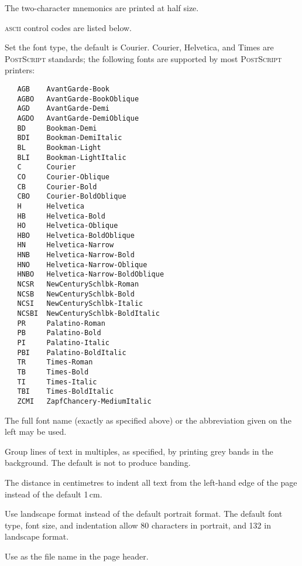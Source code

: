 \begin{description}
   The two-character mnemonics are printed at half size.

   \textsc{ascii} control codes are listed below.

\item[\exe{-f}\code{font}]
   Set the font type, the default is Courier.  Courier, Helvetica, and Times
   are \textsc{PostScript} standards; the following fonts are supported by
   most \textsc{PostScript} printers:

\begin{verbatim}
   AGB    AvantGarde-Book
   AGBO   AvantGarde-BookOblique
   AGD    AvantGarde-Demi
   AGDO   AvantGarde-DemiOblique
   BD     Bookman-Demi
   BDI    Bookman-DemiItalic
   BL     Bookman-Light
   BLI    Bookman-LightItalic
   C      Courier
   CO     Courier-Oblique
   CB     Courier-Bold
   CBO    Courier-BoldOblique
   H      Helvetica
   HB     Helvetica-Bold
   HO     Helvetica-Oblique
   HBO    Helvetica-BoldOblique
   HN     Helvetica-Narrow
   HNB    Helvetica-Narrow-Bold
   HNO    Helvetica-Narrow-Oblique
   HNBO   Helvetica-Narrow-BoldOblique
   NCSR   NewCenturySchlbk-Roman
   NCSB   NewCenturySchlbk-Bold
   NCSI   NewCenturySchlbk-Italic
   NCSBI  NewCenturySchlbk-BoldItalic
   PR     Palatino-Roman
   PB     Palatino-Bold
   PI     Palatino-Italic
   PBI    Palatino-BoldItalic
   TR     Times-Roman
   TB     Times-Bold
   TI     Times-Italic
   TBI    Times-BoldItalic
   ZCMI   ZapfChancery-MediumItalic
\end{verbatim}

\noindent
   The full font name (exactly as specified above) or the abbreviation given
   on the left may be used.

\item[\exe{-g}\code{\#}]
   Group lines of text in multiples, as specified, by printing grey bands in
   the background.  The default is not to produce banding.

\item[\exe{-i}\code{\#}]
   The distance in centimetres to indent all text from the left-hand edge of
   the page instead of the default 1\,cm.

\item[\exe{-l}]
   Use landscape format instead of the default portrait format.  The default
   font type, font size, and indentation allow 80 characters in portrait, and
   132 in landscape format.

\item[\exe{-n}\code{file}]
   Use  as the file name in the page header.


\end{description}
